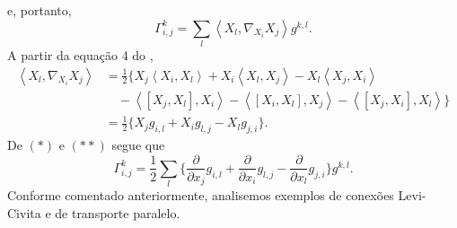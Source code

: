 e, portanto,
\begin{equation*}
    \Gamma_{i,j}^{k}=\sum_{l}\left<X_{l},\nabla_{X_{i}}X_{j}\right>g^{k,l}. \tag{*}
\end{equation*}
A partir da equação 4 do ,
\begin{align*}
    \left<X_l,\nabla_{X_i}X_j\right> & = \frac{1}{2} \Big\{ X_j\left<X_i,X_l\right> + X_i\left<X_l,X_j\right> - X_l\left<X_j,X_i\right>    \\
                                     & \quad - \left<[X_j,X_l],X_i\right> - \left<[X_i,X_l],X_j\right> - \left<[X_j,X_i],X_l\right> \Big\} \\
                                     & =\frac{1}{2}\Big\{X_{j}g_{i,l}+X_{i}g_{l,j}-X_{l}g_{j,i}\Big\}. \tag{**}
\end{align*}
De $(*)$ e $(**)$ segue que
\begin{equation*}
    \Gamma_{i,j}^{k}=\frac{1}{2}\sum_{l}\Big\{\frac{\partial}{\partial x_{j}}g_{i,l}+\frac{\partial}{\partial x_{i}}g_{l,j}-\frac{\partial}{\partial x_{l}}g_{j,i}\Big\}g^{k,l}.
\end{equation*}
Conforme comentado anteriormente, analisemos exemplos de conexões Levi-Civita e de transporte paralelo.
